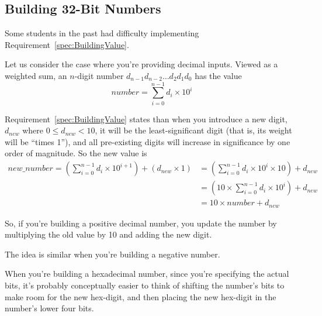 \subsection{Building 32-Bit Numbers}

Some students in the past had difficulty implementing Requirement~\ref{spec:BuildingValue}.

Let us consider the case where you're providing decimal inputs.
Viewed as a weighted sum, an $n$-digit number $d_{n-1}d_{n-2}{\dots}d_2d_1d_0$ has the value
\[number = \sum_{i=0}^{n-1}d_i \times 10^i\]

Requirement~\ref{spec:BuildingValue} states than when you introduce a new digit, $d_{new}$ where $0 \leq d_{new} < 10$, it will be the least-significant digit (that is, its weight will be ``times 1''), and all pre-existing digits will increase in significance by one order of magnitude.
So the new value is
\begin{align*}
    new\_number = \left(\sum_{i=0}^{n-1}d_i \times 10^{i+1}\right) + \left(d_{new} \times 1\right)
        & = \left(\sum_{i=0}^{n-1}d_i \times 10^i \times 10\right) + d_{new} \\
        & = \left(10 \times \sum_{i=0}^{n-1}d_i \times 10^i\right) + d_{new} \\
        & = 10 \times number + d_{new}
\end{align*}

So, if you're building a positive decimal number, you update the number by multiplying the old value by 10 and adding the new digit.

The idea is similar when you're building a negative number.

When you're building a hexadecimal number, since you're specifying the actual bits,
it's probably conceptually easier to think of shifting the number's bits to make room for the new hex-digit,
and then placing the new hex-digit in the number's lower four bits.

